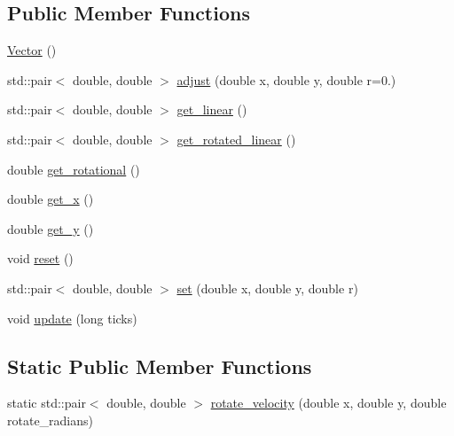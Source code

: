 \subsection*{Public Member Functions}
\begin{DoxyCompactItemize}
\item 
\hyperlink{classAsteroids_1_1Domain_1_1Game_1_1Actors_1_1Vector_a1ae45243cda745174556aaed9cb2bdab}{Vector} ()
\item 
std\+::pair$<$ double, double $>$ \hyperlink{classAsteroids_1_1Domain_1_1Game_1_1Actors_1_1Vector_a271d706f78f5f1ff2df2a5126298f9d1}{adjust} (double x, double y, double r=0.)
\item 
std\+::pair$<$ double, double $>$ \hyperlink{classAsteroids_1_1Domain_1_1Game_1_1Actors_1_1Vector_aafa43064d8a1d74908e998a613836b83}{get\+\_\+linear} ()
\item 
std\+::pair$<$ double, double $>$ \hyperlink{classAsteroids_1_1Domain_1_1Game_1_1Actors_1_1Vector_a59d89995d9c975994f8c019f94ce674f}{get\+\_\+rotated\+\_\+linear} ()
\item 
double \hyperlink{classAsteroids_1_1Domain_1_1Game_1_1Actors_1_1Vector_aa3dc427a9c067d9e385932eac8d74689}{get\+\_\+rotational} ()
\item 
double \hyperlink{classAsteroids_1_1Domain_1_1Game_1_1Actors_1_1Vector_a58840459ee79a2284b53ecfa535b0d99}{get\+\_\+x} ()
\item 
double \hyperlink{classAsteroids_1_1Domain_1_1Game_1_1Actors_1_1Vector_afb38a73b114dcb1af794748aca734d84}{get\+\_\+y} ()
\item 
void \hyperlink{classAsteroids_1_1Domain_1_1Game_1_1Actors_1_1Vector_afe2d6db6c1e45c6f3bf12404ee097200}{reset} ()
\item 
std\+::pair$<$ double, double $>$ \hyperlink{classAsteroids_1_1Domain_1_1Game_1_1Actors_1_1Vector_a607de2905a1b5e79bc10c15cf4fb0416}{set} (double x, double y, double r)
\item 
void \hyperlink{classAsteroids_1_1Domain_1_1Game_1_1Actors_1_1Vector_ad5a095932426c3eeea36d6703211dcfc}{update} (long ticks)
\end{DoxyCompactItemize}
\subsection*{Static Public Member Functions}
\begin{DoxyCompactItemize}
\item 
static std\+::pair$<$ double, double $>$ \hyperlink{classAsteroids_1_1Domain_1_1Game_1_1Actors_1_1Vector_a540d3867c26c3cc6dafeb7a055cd392d}{rotate\+\_\+velocity} (double x, double y, double rotate\+\_\+radians)
\end{DoxyCompactItemize}

